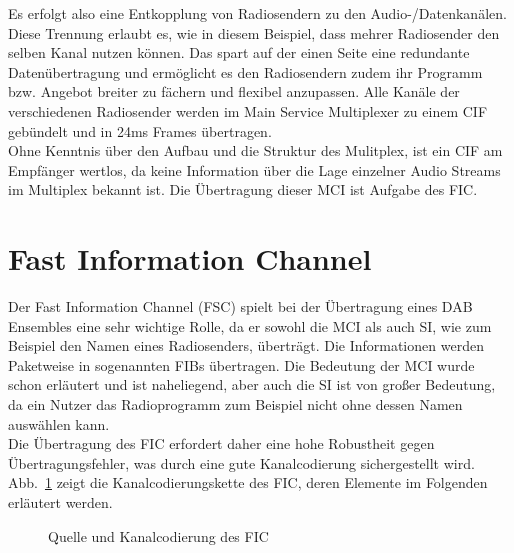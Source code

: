Es erfolgt also eine Entkopplung von Radiosendern zu den Audio-/Datenkanälen. Diese Trennung erlaubt es, wie in diesem Beispiel, dass mehrer Radiosender den selben Kanal nutzen können. Das spart auf der einen Seite eine redundante Datenübertragung und ermöglicht es den Radiosendern zudem ihr Programm bzw. Angebot breiter zu fächern und flexibel anzupassen. Alle Kanäle der verschiedenen Radiosender werden im Main Service Multiplexer zu einem \ac{CIF} gebündelt und in 24ms Frames übertragen. \\
Ohne Kenntnis über den Aufbau und die Struktur des Mulitplex, ist ein \ac{CIF} am Empfänger wertlos, da keine Information über die Lage einzelner Audio Streams im Multiplex bekannt ist. Die Übertragung dieser \ac{MCI} ist Aufgabe des \ac{FIC}.

\section{Fast Information Channel}
\label{sec:FIC}
Der Fast Information Channel (FSC) spielt bei der Übertragung eines DAB Ensembles eine sehr wichtige Rolle, da er sowohl die \ac{MCI} als auch \ac{SI}, wie zum Beispiel den Namen eines Radiosenders, überträgt. Die Informationen werden Paketweise in sogenannten \acp{FIB} übertragen. Die Bedeutung der \ac{MCI} wurde schon erläutert und ist naheliegend, aber auch die \ac{SI} ist von großer Bedeutung, da ein Nutzer das Radioprogramm zum Beispiel nicht ohne dessen Namen auswählen kann. \\
Die Übertragung des FIC erfordert daher eine hohe Robustheit gegen Übertragungsfehler, was durch eine gute Kanalcodierung sichergestellt wird. Abb.~\ref{chart:fic_encoder} zeigt die Kanalcodierungskette des FIC, deren Elemente im Folgenden erläutert werden.\\
\begin{figure} [htb]
\begin{center}
\end{center}
\caption{Quelle und Kanalcodierung des FIC}
\label{chart:fic_encoder}
\end{figure}


